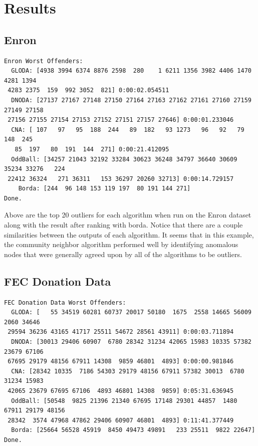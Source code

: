 \documentclass[10pt,letterpaper]{article}
\begin{document}
\section{Results}

\subsection{Enron}

\begin{verbatim}
Enron Worst Offenders:
  GLODA: [4938 3994 6374 8876 2598  280    1 6211 1356 3982 4406 1470 4281 1394
 4283 2375  159  992 3052  821] 0:00:02.054511
  DNODA: [27137 27167 27148 27150 27164 27163 27162 27161 27160 27159 27149 27158
 27156 27155 27154 27153 27152 27151 27157 27646] 0:00:01.233046
  CNA: [ 107   97   95  188  244   89  182   93 1273   96   92   79  148  245
   85  197   80  191  144  271] 0:00:21.412095
  OddBall: [34257 21043 32192 33284 30623 36248 34797 36640 30609 35234 33276   224
 22412 36324   271 36311   153 36297 20260 32713] 0:00:14.729157
    Borda: [244  96 148 153 119 197  80 191 144 271]
Done.
\end{verbatim}

Above are the top 20 outliers for each algorithm when run on the Enron dataset
along with the result after
ranking with borda. Notice that there are a couple similarities between the outputs
of each algorithm. It seems that in this example, the community neighbor algorithm
performed well by identifying anomalous nodes that were generally agreed upon by
all of the algorithms to be outliers.

\subsection{FEC Donation Data}

\begin{verbatim}
FEC Donation Data Worst Offenders:
  GLODA: [   55 34519 60281 60737 20017 50180  1675  2558 14665 56009  2060 34646
 29594 36236 43165 41717 25511 54672 28561 43911] 0:00:03.711894
  DNODA: [30013 29406 60907  6780 28342 31234 42065 15983 10335 57382 23679 67106
 67695 29179 48156 67911 14308  9859 46801  4893] 0:00:00.981846
  CNA: [28342 10335  7186 54303 29179 48156 67911 57382 30013  6780 31234 15983
 42065 23679 67695 67106  4893 46801 14308  9859] 0:05:31.636945
  OddBall: [50548  9825 21396 21340 67695 17148 29301 44857  1480 67911 29179 48156
 28342  3574 47968 47862 29406 60907 46801  4893] 0:11:41.377449
  Borda: [25664 56528 45919  8450 49473 49891   233 25511  9822 22647]
Done.
\end{verbatim}
\end{document}

